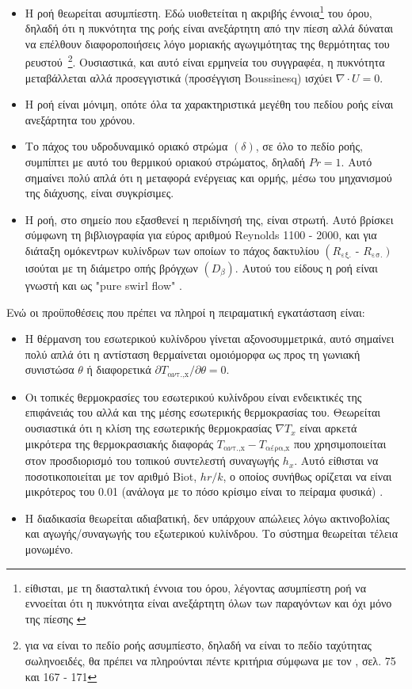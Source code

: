 \begin{itemize}
\item Η ροή θεωρείται ασυμπίεστη. Εδώ υιοθετείται η ακριβής έννοια\footnote{είθισται, με τη διασταλτική έννοια του όρου, λέγοντας ασυμπίεστη ροή να εννοείται ότι η πυκνότητα είναι ανεξάρτητη όλων των παραγόντων και όχι μόνο της πίεσης \cite{Ανδρέας2021}} του όρου, δηλαδή ότι η πυκνότητα της ροής είναι ανεξάρτητη από την πίεση αλλά δύναται να επέλθουν διαφοροποιήσεις λόγο μοριακής αγωγιμότητας της θερμότητας του ρευστού~\footnote{για να είναι το πεδίο ροής ασυμπίεστο, δηλαδή να είναι το πεδίο ταχύτητας σωληνοειδές, θα πρέπει να πληρούνται πέντε κριτήρια σύμφωνα με τον \citeauthor{2000_Batchelor_BOOK} \cite{2000_Batchelor_BOOK}, σελ. 75 και 167 - 171}. Ουσιαστικά, και αυτό είναι ερμηνεία του συγγραφέα, η πυκνότητα μεταβάλλεται αλλά προσεγγιστικά (προσέγγιση Boussinesq) ισχύει $\nabla \cdot U = 0$.
\item Η ροή είναι μόνιμη, οπότε όλα τα χαρακτηριστικά μεγέθη του πεδίου ροής είναι ανεξάρτητα του χρόνου.
\item Το πάχος του υδροδυναμικό οριακό στρώμα $\left(\delta\right)$, σε όλο το πεδίο ροής, συμπίπτει με αυτό του θερμικού οριακού στρώματος, δηλαδή $Pr = 1$. Αυτό σημαίνει πολύ απλά ότι η μεταφορά ενέργειας και ορμής, μέσω του μηχανισμού της διάχυσης, είναι συγκρίσιμες.
\item H ροή, στο σημείο που εξασθενεί η περιδίνησή της, είναι στρωτή. Αυτό βρίσκει σύμφωνη τη βιβλιογραφία \cite{Dou2005} για εύρος αριθμού Reynolds 1100 - 2000, και για διάταξη ομόκεντρων κυλίνδρων των οποίων το πάχος δακτυλίου $\left(R_{\text{εξ.}}\right.$ - $\left. R_{\text{εσ.}}\right)$ ισούται με τη διάμετρο οπής βρόγχων $\left(D_\beta\right)$. Αυτού του είδους η ροή είναι γνωστή και ως "pure swirl flow" \cite{1991_Legentilhomme}.
\end{itemize}

Ενώ οι προϋποθέσεις που πρέπει να πληροί η πειραματική εγκατάσταση είναι:

\begin{itemize}
\item Η θέρμανση του εσωτερικού κυλίνδρου γίνεται αξονοσυμμετρικά, αυτό σημαίνει πολύ απλά ότι η αντίσταση θερμαίνεται ομοιόμορφα ως προς τη γωνιακή συνιστώσα $\theta$ ή διαφορετικά $\partial T_{\text{αντ.,x}} / \partial \theta = 0$.
\item Οι τοπικές θερμοκρασίες του εσωτερικού κυλίνδρου είναι ενδεικτικές της επιφάνειάς του αλλά και της μέσης εσωτερικής θερμοκρασίας του. Θεωρείται ουσιαστικά ότι η κλίση της εσωτερικής θερμοκρασίας $\nabla T_x$ είναι αρκετά μικρότερα της θερμοκρασιακής διαφοράς $T_{\text{αντ.,x}} - T_{\text{αέρα,x}}$ που χρησιμοποιείται στον προσδιορισμό του τοπικού συντελεστή συναγωγής $h_x$. Αυτό είθισται να ποσοτικοποιείται με τον αριθμό Biot, $hr/k$,  ο οποίος συνήθως ορίζεται να είναι μικρότερος του 0.01 (ανάλογα με το πόσο κρίσιμο είναι το πείραμα φυσικά) \cite{1985_Moffat}.
\item Η διαδικασία θεωρείται αδιαβατική, δεν υπάρχουν απώλειες λόγω ακτινοβολίας και αγωγής/συναγωγής του εξωτερικού κυλίνδρου. Το σύστημα θεωρείται τέλεια μονωμένο.
\end{itemize}

